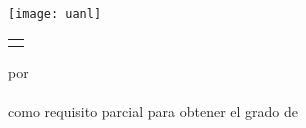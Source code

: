 \thispagestyle{empty}

\begin{scshape}
\begin{center}
	{\Large \uanl} \\[5mm]
	{\large \fcfm} \\[5mm]
	{\large \mcd}
	\vskip15mm
	\texttt{[image: uanl]}
	\vskip12mm
	\begin{tabular}{p{11cm}}
		\centering
		{\large \titulo}
	\end{tabular}
	\vskip7mm
	{por}\\[7mm]
	{\large \autor}\\[7mm]
	{como requisito parcial para obtener el grado de}\\[3mm]
	\MakeUppercase{\grado}\\
	\orientacion
	\vfill
	\fecha\\
	\uanl\\
	\fcfm
\end{center}
\end{scshape}

\newpage
\thispagestyle{empty}
\enlargethispage{5mm}

